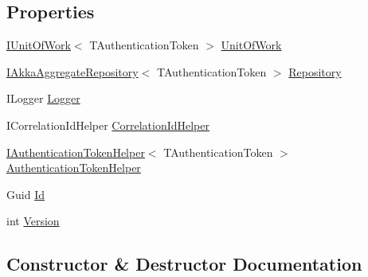 \subsection*{Properties}
\begin{DoxyCompactItemize}
\item 
\hyperlink{interfaceCqrs_1_1Domain_1_1IUnitOfWork}{I\+Unit\+Of\+Work}$<$ T\+Authentication\+Token $>$ \hyperlink{classCqrs_1_1Akka_1_1Domain_1_1AkkaAggregateRoot_a58b79dc3e0d837e58d95f5cfeb2da9a1}{Unit\+Of\+Work}
\item 
\hyperlink{interfaceCqrs_1_1Akka_1_1Domain_1_1IAkkaAggregateRepository}{I\+Akka\+Aggregate\+Repository}$<$ T\+Authentication\+Token $>$ \hyperlink{classCqrs_1_1Akka_1_1Domain_1_1AkkaAggregateRoot_ae15ae65ca994c5ab932d9817a9f7cb7d}{Repository}
\item 
I\+Logger \hyperlink{classCqrs_1_1Akka_1_1Domain_1_1AkkaAggregateRoot_a685737862246db856bf3eb94345fca3f}{Logger}
\item 
I\+Correlation\+Id\+Helper \hyperlink{classCqrs_1_1Akka_1_1Domain_1_1AkkaAggregateRoot_ae1460c9574d7d7b1cb9de2848ae7102e}{Correlation\+Id\+Helper}
\item 
\hyperlink{interfaceCqrs_1_1Authentication_1_1IAuthenticationTokenHelper}{I\+Authentication\+Token\+Helper}$<$ T\+Authentication\+Token $>$ \hyperlink{classCqrs_1_1Akka_1_1Domain_1_1AkkaAggregateRoot_a3a73139fe47221bd579949e978d0126d}{Authentication\+Token\+Helper}
\item 
Guid \hyperlink{classCqrs_1_1Akka_1_1Domain_1_1AkkaAggregateRoot_ac03d79efc02629b17642c6324ff181c9}{Id}
\item 
int \hyperlink{classCqrs_1_1Akka_1_1Domain_1_1AkkaAggregateRoot_a4b526322c63542b1da2a700ff1b48d0c}{Version}
\end{DoxyCompactItemize}


\subsection{Constructor \& Destructor Documentation}
\mbox{\label{classCqrs_1_1Akka_1_1Domain_1_1AkkaAggregateRoot_a060f981e4c3023aec36e7c6f1cfb3a9d}} 
